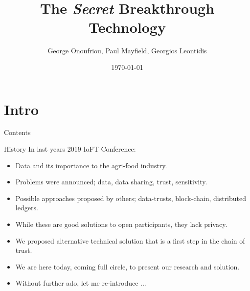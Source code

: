 \documentclass[aspectratio=169]{beamer}
\title{The \textit{Secret} Breakthrough Technology}
\author{George Onoufriou, Paul Mayfield, Georgios Leontidis}
\date{\today}
\begin{document}

  \frame{\titlepage}

  \section{Intro}

    \begin{frame}{Contents}
      \tableofcontents
    \end{frame}

    \begin{frame}{History}
      In last years 2019 IoFT Conference:
      \begin{itemize}
        \item Data and its importance to the agri-food industry.
        \item Problems were announced; data, data sharing, trust, sensitivity.
        \item Possible approaches proposed by others; data-trusts, block-chain, distributed ledgers.
        \item While these are good solutions to open participants, they lack privacy.
        \item We proposed alternative technical solution that is a first step in the chain of trust.
        \item We are here today, coming full circle, to present our research and solution.
        \item Without further ado, let me re-introduce ...
      \end{itemize}
    \end{frame}
\end{document}
